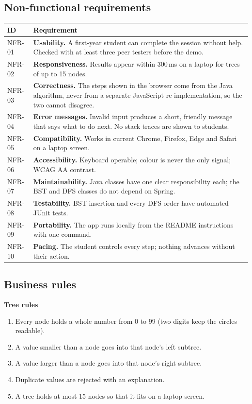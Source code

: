 \documentclass[11pt,a4paper]{article}
\begin{document}
\subsection{Non-functional requirements}

\begin{longtable}{@{}p{1.4cm} p{13.2cm}@{}}
  \toprule
  \textbf{ID} & \textbf{Requirement} \\
  \midrule
  \endhead
  NFR-01 & \textbf{Usability.} A first-year student can complete the session without help. Checked
           with at least three peer testers before the demo. \\
  NFR-02 & \textbf{Responsiveness.} Results appear within 300\,ms on a laptop for trees of up to 15 nodes. \\
  NFR-03 & \textbf{Correctness.} The steps shown in the browser come from the Java algorithm, never from a
           separate JavaScript re-implementation, so the two cannot disagree. \\
  NFR-04 & \textbf{Error messages.} Invalid input produces a short, friendly message that says what
           to do next. No stack traces are shown to students. \\
  NFR-05 & \textbf{Compatibility.} Works in current Chrome, Firefox, Edge and Safari on a laptop screen. \\
  NFR-06 & \textbf{Accessibility.} Keyboard operable; colour is never the only signal; WCAG AA contrast. \\
  NFR-07 & \textbf{Maintainability.} Java classes have one clear responsibility each; the BST and DFS
           classes do not depend on Spring. \\
  NFR-08 & \textbf{Testability.} BST insertion and every DFS order have automated JUnit tests. \\
  NFR-09 & \textbf{Portability.} The app runs locally from the README instructions with one command. \\
  NFR-10 & \textbf{Pacing.} The student controls every step; nothing advances without their action. \\
  \bottomrule
\end{longtable}

\subsection{Business rules}

\textbf{Tree rules}
\begin{enumerate}[label=BR-\arabic*, leftmargin=3.2em]
  \item Every node holds a whole number from 0 to 99 (two digits keep the circles readable).
  \item A value smaller than a node goes into that node's left subtree.
  \item A value larger than a node goes into that node's right subtree.
  \item Duplicate values are rejected with an explanation.
  \item A tree holds at most 15 nodes so that it fits on a laptop screen.
\end{enumerate}
\end{document}
